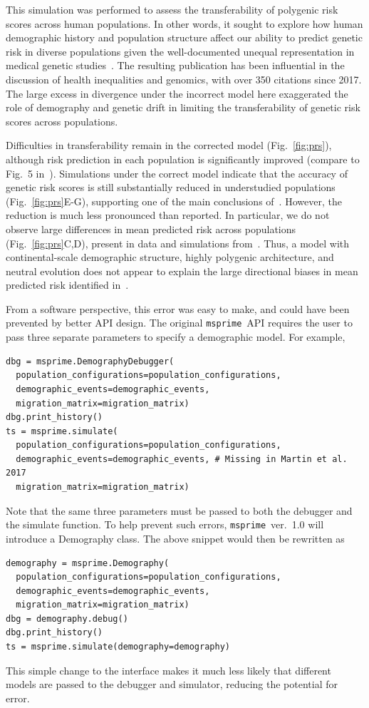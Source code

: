 \documentclass{article}
\newcommand{\msprime}[0]{\texttt{msprime}}
\begin{document}
This simulation was performed to assess the
transferability of polygenic risk scores across human populations. In other words, it sought to
explore how human demographic history and population structure affect our ability
to predict genetic risk in diverse populations given the well-documented unequal representation
in medical genetic studies~\citep{popejoy2016genomics}. The resulting publication has been
influential in the discussion of health inequalities and genomics, with over 350 citations since 2017.
The large excess in divergence under the incorrect model here exaggerated the role of demography
and genetic drift in limiting the transferability of genetic risk scores across populations.

Difficulties in transferability remain in the corrected model (Fig.~\ref{fig:prs}), although
risk prediction in each population is significantly improved (compare to Fig.~5 in~\citet{martin2017human}).
Simulations under the correct model indicate that the accuracy of genetic risk scores is still
substantially reduced in understudied populations (Fig.~\ref{fig:prs}E-G),
supporting one of the main conclusions of~\citet{martin2017human}.
However, the reduction is much less pronounced than reported.
In particular, we do not observe large differences in mean predicted risk 
across populations (Fig.~\ref{fig:prs}C,D), present in data and simulations from~\citet{martin2017human}.
Thus, a model with continental-scale demographic structure, highly polygenic architecture, and
neutral evolution does not appear to explain the large directional biases
in mean predicted risk identified in~\citet{martin2017human}.

From a software perspective, this error was easy to make, and could have been prevented by better API design.
The original \msprime\ API requires the user to pass
three separate parameters to specify a demographic model. For example,
\begin{lstlisting}[frame=single]
dbg = msprime.DemographyDebugger(
  population_configurations=population_configurations,
  demographic_events=demographic_events,
  migration_matrix=migration_matrix)
dbg.print_history()
ts = msprime.simulate(
  population_configurations=population_configurations,
  demographic_events=demographic_events, # Missing in Martin et al. 2017
  migration_matrix=migration_matrix)
\end{lstlisting}
Note that the same three parameters must be passed to both the debugger
and the simulate function.
To help prevent such errors,
\msprime~ver.~1.0 will introduce a Demography class. The above
snippet would then be rewritten as
\begin{lstlisting}[frame=single]
demography = msprime.Demography(
  population_configurations=population_configurations,
  demographic_events=demographic_events,
  migration_matrix=migration_matrix)
dbg = demography.debug()
dbg.print_history()
ts = msprime.simulate(demography=demography)
\end{lstlisting}
This simple change to the interface makes it much less likely
that different models are passed to the debugger and simulator,
reducing the potential for error.
\end{document}
